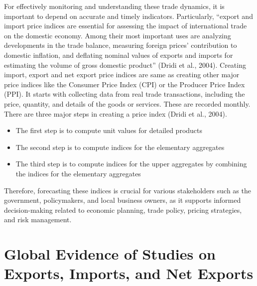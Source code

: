 \documentclass[12pt,a4paper]{report} %
\begin{document}
	For effectively monitoring and understanding these trade dynamics, it is important to depend on accurate and timely indicators. Particularly, ``export and import price indices are essential for assessing the impact of international trade on the domestic economy. Among their most important uses are analyzing developments in the trade balance, measuring foreign prices’ contribution to domestic inflation, and deflating nominal values of exports and imports for estimating the volume of gross domestic product'' (Dridi et al., 2004). Creating import, export and net export price indices are same as creating other major price indices like the Consumer Price Index (CPI) or the Producer Price Index (PPI). It starts with collecting data from real trade transactions, including the price, quantity, and details of the goods or services. These are recorded monthly. There are three major steps in creating a price index (Dridi et al., 2004). 
	
	\begin{itemize}
		\item The first step is to compute unit values for detailed products
		\item The second step is to compute indices for the elementary aggregates
		\item The third step is to compute indices for the upper aggregates by combining the indices for the elementary aggregates
	\end{itemize}
	
	Therefore, forecasting these indices is crucial for various stakeholders such as the government, policymakers, and local business owners, as it supports informed decision-making related to economic planning, trade policy, pricing strategies, and risk management. 
	
	\section{Global Evidence of Studies on Exports, Imports, and Net Exports }
	
\end{document}
